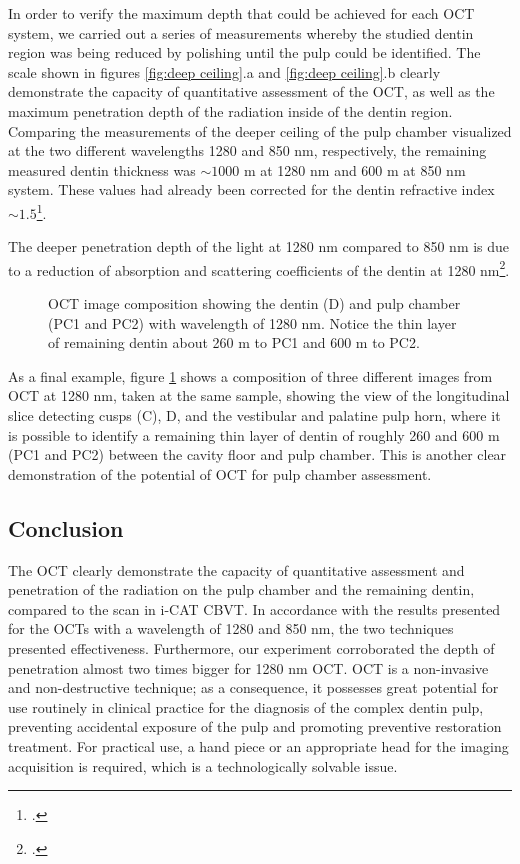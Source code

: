 \documentclass[12pt,twoside,english]{book}
\renewcommand{\~}{\perispomeni}%
\DeclareRobustCommand{\textgreek}[1]{\leavevmode{\greektext #1}}
\numberwithin{equation}{section}
\numberwithin{figure}{section}
\begin{document}
In order to verify the maximum depth that could be achieved for each OCT system, we carried out a series of measurements whereby the studied dentin region was being reduced by polishing until the pulp could be identified. The scale shown in figures \ref{fig:deep ceiling}.a and \ref{fig:deep ceiling}.b clearly demonstrate the capacity of quantitative assessment of the OCT, as well as the maximum penetration depth of the radiation inside of the dentin region. Comparing the measurements of the deeper ceiling of the pulp chamber visualized at the two different wavelengths 1280 and 850 nm, respectively, the remaining measured dentin thickness was $\sim1000$ \textgreek{m}m at 1280 nm and 600 \textgreek{m}m at 850 nm system. These values had already been corrected for the dentin refractive index $\sim1.5$\footcite{Colston:1998p1677}.

The deeper penetration depth of the light at 1280 nm compared to 850 nm is due to a reduction of absorption and scattering coefficients of the dentin at 1280 nm\footcite{Drexler:2004p1728}.
\begin{figure}[h]
\centering{}
\caption{OCT image composition showing the dentin (D) and pulp chamber (PC1 and PC2) with wavelength of 1280 nm. Notice the thin layer of remaining dentin about 260 \textgreek{m}m to PC1 and 600 \textgreek{m}m to PC2.\label{fig:image composition}}
\end{figure}

As a final example, figure \ref{fig:image composition} shows a composition of three different images from OCT at 1280 nm, taken at the same sample, showing the view of the longitudinal slice detecting cusps (C), D, and the vestibular and palatine pulp horn, where it is possible to identify a remaining thin layer of dentin of roughly 260 and 600 \textgreek{m}m (PC1 and PC2) between the cavity floor and pulp chamber. This is another clear demonstration of the potential of OCT for pulp chamber assessment.

\subsection{Conclusion}

The OCT clearly demonstrate the capacity of quantitative assessment and penetration of the radiation on the pulp chamber and the remaining dentin, compared to the scan in i-CAT CBVT. In accordance with the results presented for the OCTs with a wavelength of 1280 and 850 nm, the two techniques presented effectiveness. Furthermore, our experiment corroborated the depth of penetration almost two times bigger for 1280 nm OCT. OCT is a non-invasive and non-destructive technique; as a consequence, it possesses great potential for use routinely in clinical practice for the diagnosis of the complex dentin pulp, preventing accidental exposure of the pulp and promoting preventive restoration treatment. For practical use, a hand piece or an appropriate head for the imaging acquisition is required, which is a technologically solvable issue.
\end{document}
